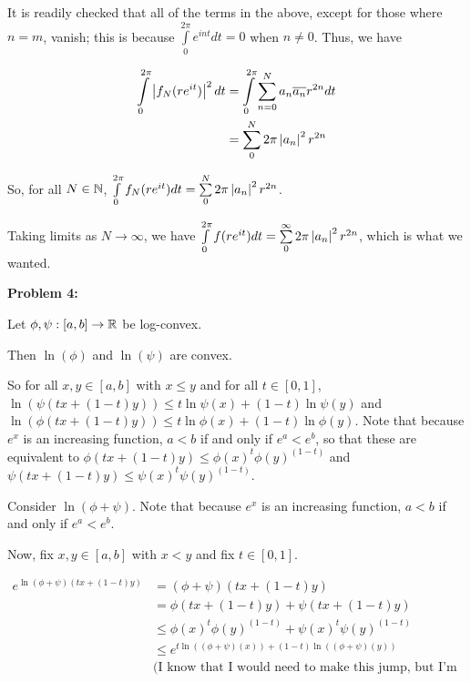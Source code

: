 \documentclass[a4paper,12pt]{article}
\begin{document}
It is readily checked that all of the terms in the above, except for those where $n=m$, vanish; this is because $\int\limits_0^{2\pi} e^{int}dt = 0$ when $n \neq 0$. Thus, we have

\begin{align*}
\int\limits_0^{2\pi} \left\lvert f_N(re^{it}) \right\rvert^2 dt &= \int\limits_0^{2\pi} \sum\limits_{n=0}^{N} a_n\overline{a_n}r^{2n} dt\\
&= \sum\limits_0^N 2\pi \left\lvert a_n \right\rvert^2 r^{2n}\\
\end{align*}

So, for all $N \in \mathbb{N}$, $\int\limits_0^{2\pi} f_N(re^{it})dt = \sum\limits_0^N 2\pi \left\lvert a_n \right\rvert^2 r^{2n}$.

Taking limits as $N \to \infty$, we have $\int\limits_0^{2\pi} f(re^{it})dt = \sum\limits_0^\infty 2\pi \left\lvert a_n \right\rvert^2 r^{2n}$, which is what we wanted.

\shunt

{\bf Problem 4:}

Let $\phi, \psi : [a,b] \to \mathbb{R}$ be log-convex.

Then $\ln(\phi)$ and $\ln(\psi)$ are convex.

So for all $x,y \in [a,b]$ with $x \leq y$ and for all $t \in [0,1]$, $\ln(\psi(tx+(1-t)y)) \leq t\ln\psi(x) + (1-t)\ln\psi(y)$ and $\ln(\phi(tx+(1-t)y)) \leq t\ln\phi(x) + (1-t)\ln\phi(y)$. Note that because $e^x$ is an increasing function, $a<b$ if and only if $e^a < e^b$, so that these are equivalent to $\phi(tx+(1-t)y) \leq \phi(x)^t\phi(y)^{(1-t)}$ and $\psi(tx+(1-t)y) \leq \psi(x)^t\psi(y)^{(1-t)}$. 

Consider $\ln(\phi + \psi)$. Note that because $e^x$ is an increasing function, $a<b$ if and only if $e^a < e^b$.

Now, fix $x,y \in [a,b]$ with $x<y$ and fix $t \in [0,1]$.

\begin{align*}
e^{\ln(\phi + \psi)(tx+(1-t)y)} &= (\phi + \psi)(tx+(1-t)y)\\
&= \phi(tx+(1-t)y) + \psi(tx+(1-t)y)\\
&\leq \phi(x)^t\phi(y)^{(1-t)} + \psi(x)^t\psi(y)^{(1-t)}\\
&\leq e^{t\ln((\phi+\psi)(x)) + (1-t)\ln((\phi+\psi)(y))} \\
&\text{(I know that I would need to make this jump, but I'm not sure how to make it.)}
\end{align*} %
\end{document}

